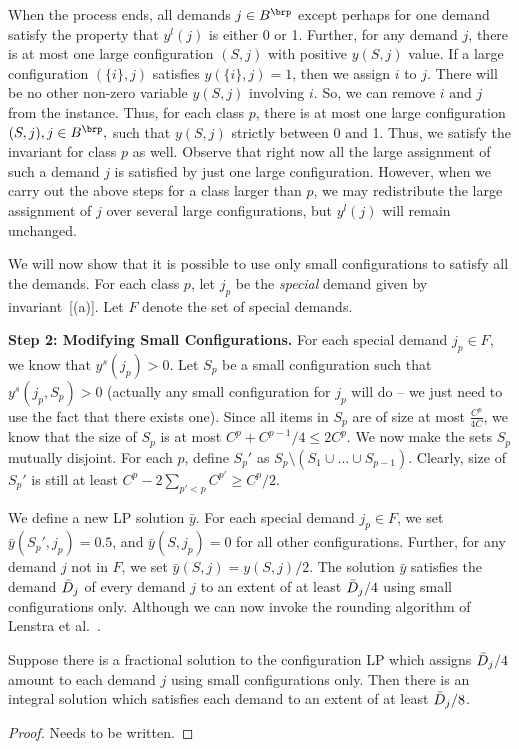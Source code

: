 When the process ends, all demands $j \in B^\brp$  except perhaps for one demand satisfy the property that $y^l(j)$ is either 0 or 1. Further, for any demand $j$, there is at most one large configuration $(S,j)$ with positive $y(S,j)$ value. If a large configuration $(\{i\},j)$ satisfies $y(\{i\},j)=1$, then we assign $i$ to $j$. There will be no other non-zero variable  $y(S,j)$ involving $i$. So, we can remove $i$ and $j$ from the instance. Thus, for each class $p$, there is at most one large configuration $(S,j), j \in B^\brp,$  such that $y(S,j)$ strictly between 0 and 1.  Thus, we  satisfy the invariant for class $p$ as well. Observe that right now all the large assignment of such a demand $j$ is satisfied by just one large configuration. However, when we carry out the
above steps for a class larger than $p$, we may redistribute the large assignment of $j$ over several large configurations, but $y^l(j)$ will remain unchanged. 


We will now show that it is possible to use only small configurations to satisfy all the demands. 
For each class $p$, let $j_p$ be the {\em special} demand given by invariant~[(a)]. Let $F$ denote the set of special demands.

\medskip \noindent
{\bf Step 2: Modifying Small Configurations.} For each special demand $j_p \in F$, we know that $y^s(j_p) > 0$. Let $S_p$ be a small configuration such that $y^s(j_p, S_p) > 0$ (actually any small configuration for $j_p$ will do -- we just need to use the fact that there exists one).
 Since all items in $S_p$ are of size at most $\frac{C^p}{4C}$, we know that the size of $S_p$ is at most $C^p + C^{p-1}/4 \leq 2C^p$. We now make the sets $S_p$ mutually disjoint. For each $p$, define $S_p'$ as $S_p \setminus (S_1 \cup \ldots \cup S_{p-1})$. Clearly, size of $S_p'$ is still at least $C^p - 2\sum_{p' < p} C^{p'} \geq C^p/2. $

We define a new LP solution ${\bar y}$.
For each special demand $j_p \in F$,
we set ${\bar y}(S_p',j_p) = 0.5$, and ${\bar y}(S,j_p) = 0$ for all other configurations. Further, for any demand $j$ not in $F$, we set ${\bar y}(S,j) =  y(S,j)/2$. The solution ${\bar y}$ satisfies the demand ${\bar D}_j$ of every demand $j$ to an extent of at least ${\bar D}_j/4$ using small configurations only.  Although we can now invoke the rounding algorithm of Lenstra et al.~\cite{}. 

\begin{lemma}
\label{lem:lst}
Suppose there is a fractional solution to the configuration LP which assigns ${\bar D}_j/4$ amount to each demand $j$ using small configurations only. 
Then there is an integral solution which satisfies each demand to an extent of at least ${\bar D}_j/8$. 
\end{lemma}
\begin{proof}
Needs to be written.
\end{proof}

